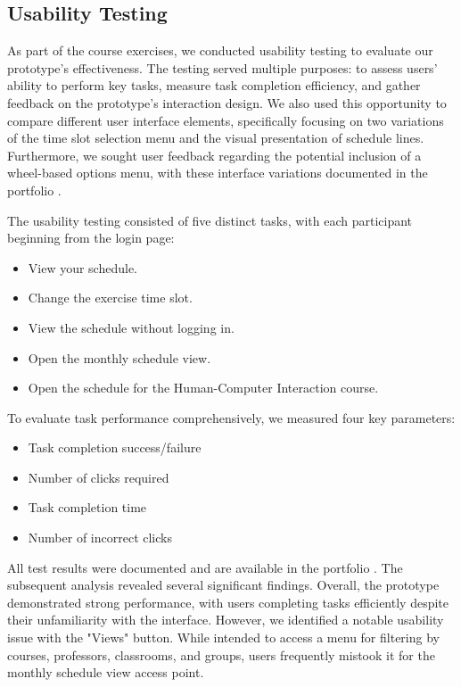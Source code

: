 \documentclass[sigconf,nonacm]{acmart}
\begin{document}
\subsection{Usability Testing}
As part of the course exercises, we conducted usability testing to evaluate our prototype's effectiveness. The testing served multiple purposes: to assess users' ability to perform key tasks, measure task completion efficiency, and gather feedback on the prototype's interaction design. We also used this opportunity to compare different user interface elements, specifically focusing on two variations of the time slot selection menu and the visual presentation of schedule lines. Furthermore, we sought user feedback regarding the potential inclusion of a wheel-based options menu, with these interface variations documented in the portfolio \cite{figma1}.

The usability testing consisted of five distinct tasks, with each participant beginning from the login page:

\begin{itemize}
\item View your schedule.
\item Change the exercise time slot.
\item View the schedule without logging in.
\item Open the monthly schedule view.
\item Open the schedule for the Human-Computer Interaction course.
\end{itemize}

To evaluate task performance comprehensively, we measured four key parameters:

\begin{itemize}
\item Task completion success/failure
\item Number of clicks required
\item Task completion time
\item Number of incorrect clicks
\end{itemize}

All test results were documented and are available in the portfolio \cite{testing}. The subsequent analysis revealed several significant findings. Overall, the prototype demonstrated strong performance, with users completing tasks efficiently despite their unfamiliarity with the interface. However, we identified a notable usability issue with the "Views" button. While intended to access a menu for filtering by courses, professors, classrooms, and groups, users frequently mistook it for the monthly schedule view access point.
\end{document}
